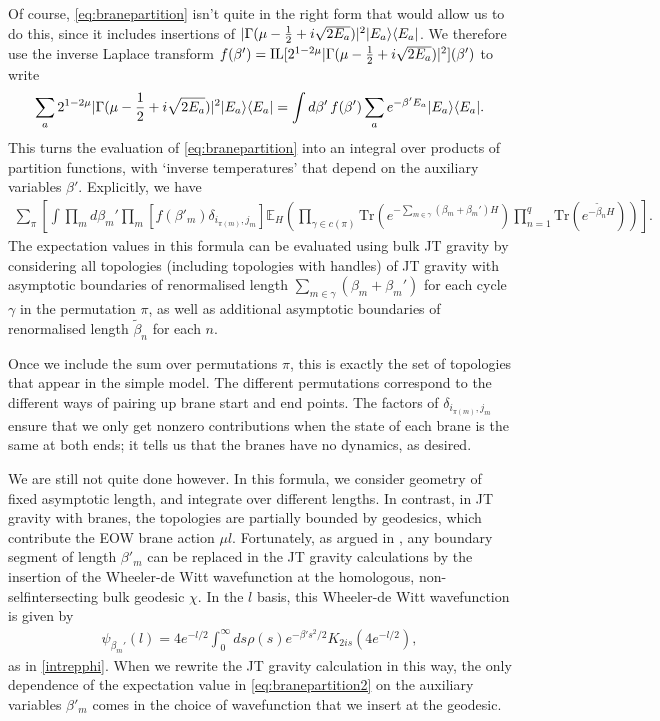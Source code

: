 \documentclass[11pt]{article}
\renewcommand{\tilde}{\widetilde}
\numberwithin{equation}{section}
\def\Tr{\text{Tr}}
\begin{document}
Of course, \eqref{eq:branepartition} isn't quite in the right form that would allow us to do this, since it includes insertions of $|\Gamma(\mu-{1\over 2}+i\sqrt{2 E_a})|^2 |E_a \rangle\langle E_a|$. We therefore use the inverse Laplace transform $f (\beta') =\text{IL}[2^{1 - 2\mu} |\Gamma(\mu-{1\over 2}+i\sqrt{2 E_a})|^2](\beta')$ to write
\begin{align}
\sum_a 2^{1-2 \mu} |\Gamma(\mu-{1\over 2}+i\sqrt{2 E_a})|^2 |E_a \rangle\langle E_a| = \int d \beta'  \,f(\beta') \sum_a e^{-\beta' E_a}   |E_a \rangle\langle E_a|.
\end{align}
This turns the evaluation of \eqref{eq:branepartition}  into an integral over products of partition functions, with `inverse temperatures' that depend on the auxiliary variables $\beta'$. Explicitly, we have
\begin{align} \label{eq:branepartition2}
\sum_\pi \left[\int \prod_{m} d\beta_m' \prod_{m}[ f(\beta'_m) \delta_{i_{\pi(m)},j_m}]  \mathbb{E}_H \left(\prod_{\gamma \in c(\pi)} \Tr\left(e^{- \sum_{m \in \gamma} (\beta_m + \beta_m') H}\right) \prod_{n=1}^q \Tr(e^{- \tilde{\beta}_n H}) \right)\right].
\end{align}
The expectation values in this formula can be evaluated using bulk JT gravity by considering all topologies (including topologies with handles) of JT gravity with asymptotic boundaries of renormalised length $\sum_{m \in \gamma} (\beta_m + \beta_m')$ for each cycle $\gamma$ in the permutation $\pi$, as well as additional asymptotic boundaries of renormalised length $\tilde{\beta}_n$ for each $n$.

Once we include the sum over permutations $\pi$, this is exactly the set of topologies that appear in the simple model. The different permutations correspond to the different ways of pairing up brane start and end points. The factors of $\delta_{i_{\pi(m)},j_m}$ ensure that we only get nonzero contributions when the state of each brane is the same at both ends; it tells us that the branes have no dynamics, as desired. 

We are still not quite done however. In this formula, we consider geometry of fixed asymptotic length, and integrate over different lengths. In contrast, in JT gravity with branes, the topologies are partially bounded by geodesics, which contribute the EOW brane action $\mu l$. Fortunately, as argued in \cite{Yang:2018gdb,Saad:2019pqd}, any boundary segment of length $\beta'_m$ can be replaced in the JT gravity calculations by the insertion of the Wheeler-de Witt wavefunction at the homologous, non-selfintersecting bulk geodesic $\chi$. In the $l$ basis, this Wheeler-de Witt wavefunction is given by
\begin{align}
\psi_{\beta_m'} (l) = 4 e^{-l/2} \int_0^\infty ds \rho(s) e^{- \beta' s^2/2} K_{2 i s} (4e^{-l/2}),
\end{align}
as in \eqref{intrepphi}. When we rewrite the JT gravity calculation in this way, the only dependence of the expectation value in  \eqref{eq:branepartition2} on the auxiliary variables $\beta'_m$ comes in the choice of wavefunction that we insert at the geodesic.
\end{document}
